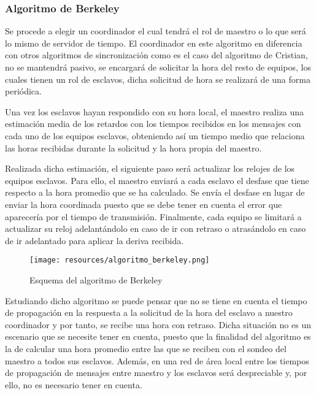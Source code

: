 \documentclass[a4paper, 11pt, titlepage]{article}
\begin{document}
        \subsubsection{Algoritmo de Berkeley}

            Se procede a elegir un coordinador el cual tendrá el rol de maestro o lo que será lo mismo 
            de servidor de tiempo. El coordinador en este algoritmo en diferencia con otros algoritmos 
            de sincronización como es el caso del algoritmo de Cristian, no se mantendrá pasivo, se 
            encargará de solicitar la hora del resto de equipos, los cuales tienen un rol de esclavos, 
            dicha solicitud de hora se realizará de una forma periódica.

            Una vez los esclavos hayan respondido con su hora local, el maestro realiza una estimación 
            media de los retardos con los tiempos recibidos en los mensajes con cada uno de los equipos 
            esclavos, obteniendo así un tiempo medio que relaciona las horas recibidas durante la 
            solicitud y la hora propia del maestro.
            
            Realizada dicha estimación, el siguiente paso será actualizar los relojes de los equipos 
            esclavos. Para ello, el maestro enviará a cada esclavo el desfase que tiene respecto a la 
            hora promedio que se ha calculado. Se envía el desfase en lugar de enviar la hora coordinada 
            puesto que se debe tener en cuenta el error que aparecería por el tiempo de transmisión. 
            Finalmente, cada equipo se limitará a actualizar su reloj adelantándolo en caso de ir con 
            retraso o atrasándolo en caso de ir adelantado para aplicar la deriva recibida.
        
            \begin{figure}[htp]
                \centering
                \texttt{[image: resources/algoritmo\_berkeley.png]}
                \caption{Esquema del algoritmo de Berkeley}
                \label{algoritmo_berkeley}
            \end{figure}

            Estudiando dicho algoritmo se puede pensar que no se tiene en cuenta el tiempo de propagación 
            en la respuesta a la solicitud de la hora del esclavo a nuestro coordinador y por tanto, se 
            recibe una hora con retraso. Dicha situación no es un escenario que se necesite tener en 
            cuenta, puesto que la finalidad del algoritmo es la de calcular una hora promedio entre las 
            que se reciben con el sondeo del maestro a todos sus esclavos. Además, en una red de área 
            local entre los tiempos de propagación de mensajes entre maestro y los esclavos será 
            despreciable y, por ello, no es necesario tener en cuenta.
\end{document}
